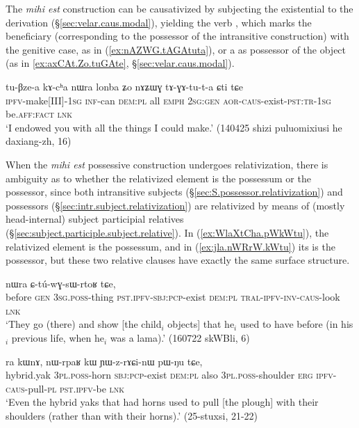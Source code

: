  The  \textit{mihi est} construction can be causativized by subjecting the existential  to the  derivation (§\ref{sec:velar.caus.modal}), yielding the verb , which marks the beneficiary (corresponding to the possessor of the intransitive construction) with the genitive case, as  in (\ref{ex:nAZWG.tAGAtuta}), or a as possessor of the object (as in \ref{ex:axCAt.Zo.tuGAte}, §\ref{sec:velar.caus.modal}).
 
 \begin{exe}
\ex \label{ex:nAZWG.tAGAtuta}
\gll tu-βze-a kɤ-cʰa nɯra lonba ʑo nɤʑɯɣ tɤ-ɣɤ-tu-t-a ɕti tɕe \\
\textsc{ipfv}-make[III]-\textsc{1sg} \textsc{inf}-can \textsc{dem}:\textsc{pl} all \textsc{emph} \textsc{2sg}:\textsc{gen} \textsc{aor}-\textsc{caus}-exist-\textsc{pst}:\textsc{tr}-\textsc{1sg} be.\textsc{aff}:\textsc{fact} \textsc{lnk} \\
\glt  `I endowed you with all the things I could make.' (140425 shizi puluomixiusi he daxiang-zh, 16)
 \end{exe}
 
 
When the \textit{mihi est} possessive construction undergoes relativization, there is ambiguity as to whether the relativized element is the possessum or the possessor, since both intransitive subjects (§\ref{sec:S.possessor.relativization}) and possessors (§\ref{sec:intr.subject.relativization}) are relativized by means of (mostly head-internal) subject participial relatives (§\ref{sec:subject.participle.subject.relative}). In (\ref{ex:WlaXtCha.pWkWtu}), the relativized element is the possessum, and in (\ref{ex:jla.nWRrW.kWtu}) its is the possessor, but these two relative clauses have exactly the same surface structure.
 
 \begin{exe}
\ex \label{ex:WlaXtCha.pWkWtu}
 nɯra ɕ-tú-wɣ-sɯ-rtoʁ tɕe, \\
before \textsc{gen} \textsc{3sg}.\textsc{poss}-thing \textsc{pst}.\textsc{ipfv}-\textsc{sbj}:\textsc{pcp}-exist \textsc{dem}:\textsc{pl} \textsc{tral}-\textsc{ipfv}-\textsc{inv}-\textsc{caus}-look \textsc{lnk} \\
\glt `They go (there) and show [the child$_i$ objects] that he$_i$ used to have before (in his$_i$ previous life, when he$_i$ was a lama).' (160722 skWBli, 6)
 \end{exe}
 
\begin{exe}
\ex \label{ex:jla.nWRrW.kWtu}
 ra kɯnɤ, nɯ-rpaʁ kɯ ɲɯ-z-rɤɕi-nɯ pɯ-ŋu tɕe, \\
hybrid.yak \textsc{3pl}.\textsc{poss}-horn \textsc{sbj}:\textsc{pcp}-exist \textsc{dem}:\textsc{pl} also \textsc{3pl}.\textsc{poss}-shoulder \textsc{erg} \textsc{ipfv}-\textsc{caus}-pull-\textsc{pl} \textsc{pst}.\textsc{ipfv}-be \textsc{lnk} \\
\glt `Even the hybrid yaks that had horns used to pull [the plough] with their shoulders (rather than with their horns).' (25-stuxsi, 21-22)
  \end{exe}


